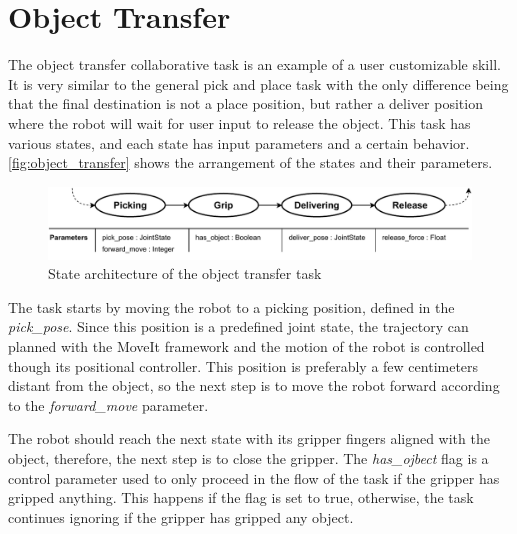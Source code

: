 




\section{Object Transfer}


\par The object transfer collaborative task is an example of a user customizable skill. It is very similar to the general pick and place task with the only difference being that the final destination is not a place position, but rather a deliver position where the robot will wait for user input to release the object. This task has various states, and each state has input parameters and a certain behavior. \autoref{fig:object_transfer} shows the arrangement of the states and their parameters.

\begin{figure}[h]
    \centering
    \includegraphics[width=\linewidth]{figs/chp5/pick_and_deliver.pdf}
    \caption{State architecture of the object transfer task}
    \label{fig:object_transfer}
\end{figure}

\par The task starts by moving the robot to a picking position, defined in the \textit{pick\_pose}. Since this position is a predefined joint state, the trajectory can planned with the MoveIt framework and the motion of the robot is controlled though its positional controller. This position is preferably a few centimeters distant from the object, so the next step is to move the robot forward according to the \textit{forward\_move} parameter.

\par The robot should reach the next state with its gripper fingers aligned with the object, therefore, the next step is to close the gripper. The \textit{has\_ojbect} flag is a control parameter used to only proceed in the flow of the task if the gripper has gripped anything. This happens if the flag is set to true, otherwise, the task continues ignoring if the gripper has gripped any object.

